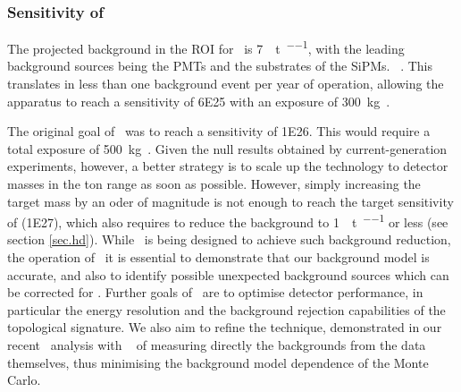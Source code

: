 
\subsubsection{Sensitivity of \Next}

The projected background in the ROI for \Next\ is \SI{7}{\ev\per\tonne\per\yr}, with the leading background sources being the PMTs and the substrates of the SiPMs.
~\cite{Martin-Albo:2015rhw}.  This translates in less than one background event per year of operation, allowing the apparatus to reach 
a sensitivity of \SI{6E25}{\yr} with an exposure of \SI{300}{\kg\yr}. 

\indent

The original goal of \Next\ was to reach a sensitivity of \SI{1E26}{\yr}. This would require a total exposure of \SI{500}{\kg\yr}. Given the null results obtained 
by current-generation experiments, however, a better strategy is to scale up the technology to detector masses in the ton range as soon as possible. However, simply increasing the target mass by an oder of magnitude is not enough to reach the target sensitivity of \NHD (\SI{1E27}{\yr}), which also requires to reduce the background to \SI{1}{\ev\per\tonne\per\yr} or less (see section \ref{sec.hd}). While \NHD\ is being designed to achieve such background reduction, the operation of \Next\ it is essential to demonstrate that our background model is accurate, and also to identify possible unexpected background sources which can be corrected for \NHD. Further goals of \Next\ are to optimise detector performance, in particular the energy resolution and the background rejection capabilities of the topological signature. We also aim to refine the technique, demonstrated in our recent \bbtnu\ analysis with \NEW\ \cite{nextcollaboration2021measurement} of measuring directly the backgrounds from the data themselves, thus minimising the background model dependence of the Monte Carlo.  




